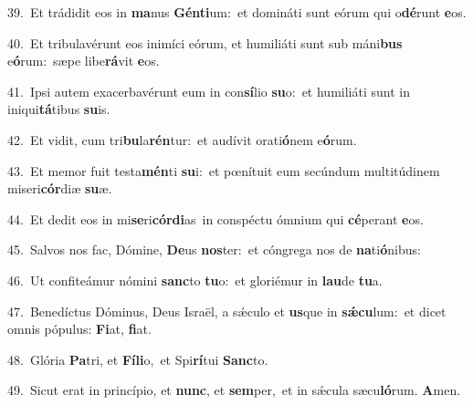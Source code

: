 {\numbfont\textcolor{\numbcolor}{39.}}~Et trádidit eos in \textbf{ma}\-nus \textbf{Gén}\-\textbf{ti}um:~\star et domináti sunt eórum qui o\-\textbf{dé}\-runt \textbf{e}\-os.\par
{\numbfont\textcolor{\numbcolor}{40.}}~Et tribulavérunt eos inimíci eórum, et humiliáti sunt sub máni\textbf{bus} e\-\textbf{ó}\-rum:~\star sæpe libe\-\textbf{rá}\-vit \textbf{e}\-os.\par
{\numbfont\textcolor{\numbcolor}{41.}}~Ipsi autem exacerbavérunt eum in con\-\textbf{sí}\-lio \textbf{su}\-o:~\star et humiliáti sunt in iniqui\-\textbf{tá}\-tibus \textbf{su}\-is.\par
{\numbfont\textcolor{\numbcolor}{42.}}~Et vidit, cum tri\-\textbf{bu}\-la\-\textbf{rén}\-tur:~\star et audívit orati\-\textbf{ó}\-nem e\-\textbf{ó}\-rum.\par
{\numbfont\textcolor{\numbcolor}{43.}}~Et memor fuit testa\-\textbf{mén}\-ti \textbf{su}\-i:~\star et pœnítuit eum secúndum multitúdinem miseri\-\textbf{cór}\-diæ \textbf{su}\-æ.\par
{\numbfont\textcolor{\numbcolor}{44.}}~Et dedit eos in mi\-\textbf{se}\-ri\-\textbf{cór}\-\textbf{di}as~\star in conspéctu ómnium qui \textbf{cé}\-perant \textbf{e}\-os.\par
{\numbfont\textcolor{\numbcolor}{45.}}~Salvos nos fac, Dómine, \textbf{De}\-us \textbf{nos}\-ter:~\star et cóngrega nos de \textbf{na}\-ti\-\textbf{ó}\-nibus:\par
{\numbfont\textcolor{\numbcolor}{46.}}~Ut confiteámur nómini \textbf{sanc}\-to \textbf{tu}\-o:~\star et gloriémur in \textbf{lau}\-de \textbf{tu}\-a.\par
{\numbfont\textcolor{\numbcolor}{47.}}~Benedíctus Dóminus, Deus Israël, a sǽculo et \textbf{us}\-que in \textbf{sǽ}\-\textbf{cu}lum:~\star et dicet omnis pópulus: \textbf{Fi}\-at, \textbf{fi}\-at.\par
{\numbfont\textcolor{\numbcolor}{48.}}~Glória \textbf{Pa}\-tri, et \textbf{Fí}\-\textbf{li}o,~\star et Spi\-\textbf{rí}\-tui \textbf{Sanc}\-to.\par
{\numbfont\textcolor{\numbcolor}{49.}}~Sicut erat in princípio, et \textbf{nunc}\-, et \textbf{sem}\-per,~\star et in sǽcula sæcu\-\textbf{ló}\-rum. \textbf{A}\-men.\par
